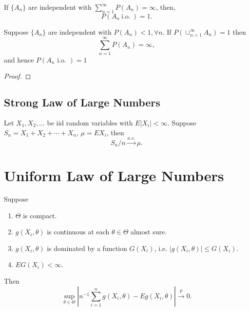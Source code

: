 \begin{lemma}
	If $\{A_n\}$ are independent with $\sum_{n=1}^{\infty}P\left(A_{n}\right)=\infty$, then,
	\begin{equation}
		P\left(A_{n}\ \text{i.o.}\ \right)=1.
	\end{equation}
\end{lemma}

\begin{corollary}
	Suppose $\{A_{n}\}$ are independent with $P\left(A_{n}\right)<1,\forall n$. If $P\left(\cup_{n=1}^{\infty}A_{n}\right)=1$ then
	\begin{equation}
		\sum_{n=1}^{\infty}P\left(A_{n}\right)=\infty,
	\end{equation}
	and hence $P\left(A_{n}\text{ i.o. }\right)=1$
\end{corollary}

\begin{proof}

\end{proof}

\subsection{Strong Law of Large Numbers}

\begin{theorem} \label{thm:SLLN}
	Let $X_1,X_2,\ldots$ be iid random variables with $E|X_i|<\infty$. Suppose $S_n=X_1+X_2+\cdots+X_n$, $\mu=EX_i$, then
	\begin{equation}
		S_n/n\stackrel{a.s.}{\rightarrow}\mu.
	\end{equation}
\end{theorem}

\section{Uniform Law of Large Numbers}

\begin{theorem} \label{thm:ULLN}
	Suppose
	\begin{enumerate}
		\item $\Theta$ is compact.
		\item $g\left(X_{i},\theta\right)$ is continuous at each $\theta\in\Theta$ almost sure.
		\item $g\left(X_{i},\theta\right)$ is dominated by a function $G\left(X_{i}\right)$, i.e. $\left|g\left(X_{i},\theta\right)\right|\leq G\left(X_{i}\right)$.
		\item $EG\left(X_{i}\right)<\infty$.
	\end{enumerate}
	Then
	\begin{equation}
		\sup_{\theta\in\Theta}\left|n^{-1}\sum_{i=1}^{n}g\left(X_{i},\theta\right)-Eg\left(X_{i},\theta\right)\right|\stackrel{p}{\rightarrow}0.
	\end{equation}
\end{theorem}

